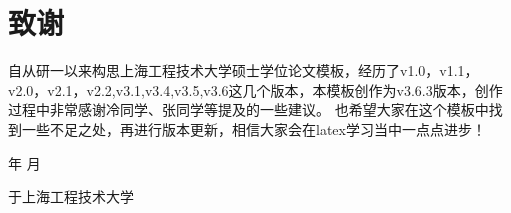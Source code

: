 \chapter*{致谢}
\thispagestyle{plain}

自从研一以来构思上海工程技术大学硕士学位论文模板，经历了v1.0，v1.1，v2.0，v2.1，v2.2,v3.1,v3.4,v3.5,v3.6这几个版本，本模板创作为v3.6.3版本，创作过程中非常感谢冷同学、张同学等提及的一些建议。
也希望大家在这个模板中找到一些不足之处，再进行版本更新，相信大家会在latex学习当中一点点进步！

\vspace{0.56\textheight}

\begin{flushright}
    \number\year  年 \number\month  月
    
    于上海工程技术大学
\end{flushright}

